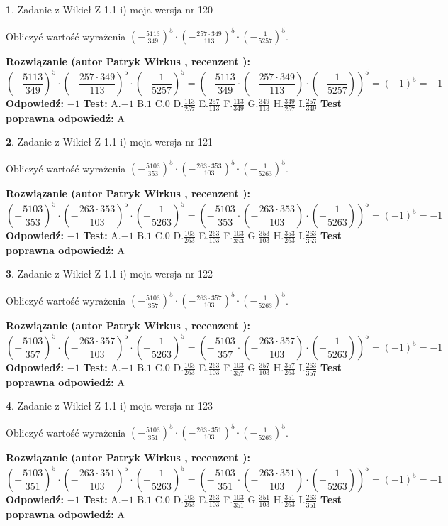 \documentclass[12pt, a4paper]{article}
\theoremstyle{definition} %
\newtheorem{zad}{}
\newcommand{\zadStart}[1]{\begin{zad}#1\newline}
\newcommand{\zadStop}{\end{zad}}
\newcommand{\rozwStart}[2]{\noindent \textbf{Rozwiązanie (autor #1 , recenzent #2): }\newline}
\newcommand{\rozwStop}{\newline}
\newcommand{\odpStart}{\noindent \textbf{Odpowiedź:}\newline}
\newcommand{\odpStop}{\newline}
\newcommand{\testStart}{\noindent \textbf{Test:}\newline}
\newcommand{\testStop}{\newline}
\newcommand{\kluczStart}{\noindent \textbf{Test poprawna odpowiedź:}\newline}
\newcommand{\kluczStop}{\newline}
\begin{document}
\zadStart{Zadanie z Wikieł Z 1.1 i) moja wersja nr 120}

Obliczyć wartość wyrażenia $(-\frac{5113}{349})^{5} \cdot (-\frac{257 \cdot 349}{113})^{5} \cdot (-\frac{1}{5257})^{5}$.
\zadStop
\rozwStart{Patryk Wirkus}{}
$$(-\frac{5113}{349})^{5} \cdot (-\frac{257 \cdot 349}{113})^{5} \cdot (-\frac{1}{5257})^{5} = (-\frac{5113}{349} \cdot (-\frac{257 \cdot 349}{113}) \cdot (-\frac{1}{5257}))^{5} = (-1)^{5} = -1$$
\rozwStop
\odpStart
$-1$
\odpStop
\testStart
A.$-1$ B.$1$ C.$0$ D.$\frac{113}{257}$ E.$\frac{257}{113}$
F.$\frac{113}{349}$ G.$\frac{349}{113}$
H.$\frac{349}{257}$
I.$\frac{257}{349}$
\testStop
\kluczStart
A
\kluczStop



\zadStart{Zadanie z Wikieł Z 1.1 i) moja wersja nr 121}

Obliczyć wartość wyrażenia $(-\frac{5103}{353})^{5} \cdot (-\frac{263 \cdot 353}{103})^{5} \cdot (-\frac{1}{5263})^{5}$.
\zadStop
\rozwStart{Patryk Wirkus}{}
$$(-\frac{5103}{353})^{5} \cdot (-\frac{263 \cdot 353}{103})^{5} \cdot (-\frac{1}{5263})^{5} = (-\frac{5103}{353} \cdot (-\frac{263 \cdot 353}{103}) \cdot (-\frac{1}{5263}))^{5} = (-1)^{5} = -1$$
\rozwStop
\odpStart
$-1$
\odpStop
\testStart
A.$-1$ B.$1$ C.$0$ D.$\frac{103}{263}$ E.$\frac{263}{103}$
F.$\frac{103}{353}$ G.$\frac{353}{103}$
H.$\frac{353}{263}$
I.$\frac{263}{353}$
\testStop
\kluczStart
A
\kluczStop



\zadStart{Zadanie z Wikieł Z 1.1 i) moja wersja nr 122}

Obliczyć wartość wyrażenia $(-\frac{5103}{357})^{5} \cdot (-\frac{263 \cdot 357}{103})^{5} \cdot (-\frac{1}{5263})^{5}$.
\zadStop
\rozwStart{Patryk Wirkus}{}
$$(-\frac{5103}{357})^{5} \cdot (-\frac{263 \cdot 357}{103})^{5} \cdot (-\frac{1}{5263})^{5} = (-\frac{5103}{357} \cdot (-\frac{263 \cdot 357}{103}) \cdot (-\frac{1}{5263}))^{5} = (-1)^{5} = -1$$
\rozwStop
\odpStart
$-1$
\odpStop
\testStart
A.$-1$ B.$1$ C.$0$ D.$\frac{103}{263}$ E.$\frac{263}{103}$
F.$\frac{103}{357}$ G.$\frac{357}{103}$
H.$\frac{357}{263}$
I.$\frac{263}{357}$
\testStop
\kluczStart
A
\kluczStop



\zadStart{Zadanie z Wikieł Z 1.1 i) moja wersja nr 123}

Obliczyć wartość wyrażenia $(-\frac{5103}{351})^{5} \cdot (-\frac{263 \cdot 351}{103})^{5} \cdot (-\frac{1}{5263})^{5}$.
\zadStop
\rozwStart{Patryk Wirkus}{}
$$(-\frac{5103}{351})^{5} \cdot (-\frac{263 \cdot 351}{103})^{5} \cdot (-\frac{1}{5263})^{5} = (-\frac{5103}{351} \cdot (-\frac{263 \cdot 351}{103}) \cdot (-\frac{1}{5263}))^{5} = (-1)^{5} = -1$$
\rozwStop
\odpStart
$-1$
\odpStop
\testStart
A.$-1$ B.$1$ C.$0$ D.$\frac{103}{263}$ E.$\frac{263}{103}$
F.$\frac{103}{351}$ G.$\frac{351}{103}$
H.$\frac{351}{263}$
I.$\frac{263}{351}$
\testStop
\kluczStart
A
\kluczStop
\end{document}
